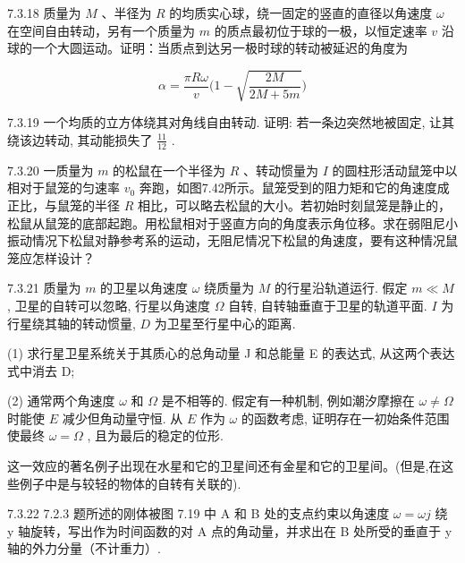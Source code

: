 \begin{problem}{7.3.18}
质量为 $M$ 、半径为 $R$ 的均质实心球，绕一固定的竖直的直径以角速度 $\omega$ 在空间自由转动，另有一个质量为 $m$ 的质点最初位于球的一极，以恒定速率 $v$ 沿球的一个大圆运动。证明：当质点到达另一极时球的转动被延迟的角度为

\[
\alpha = \frac {\pi R \omega}{v} \bigg (1 - \sqrt {\frac {2 M}{2 M + 5 m}} \bigg)
\]
\end{problem}
\clearpage


\begin{problem}{7.3.19}
一个均质的立方体绕其对角线自由转动. 证明: 若一条边突然地被固定, 让其绕该边转动, 其动能损失了 $\frac{11}{12}$ .
\end{problem}
\clearpage


\begin{problem}{7.3.20}
一质量为 $m$ 的松鼠在一个半径为 $R$ 、转动惯量为 $I$ 的圆柱形活动鼠笼中以相对于鼠笼的匀速率 $v_0$ 奔跑，如图7.42所示。鼠笼受到的阻力矩和它的角速度成正比，与鼠笼的半径 $R$ 相比，可以略去松鼠的大小。若初始时刻鼠笼是静止的，松鼠从鼠笼的底部起跑。用松鼠相对于竖直方向的角度表示角位移。求在弱阻尼小振动情况下松鼠对静参考系的运动，无阻尼情况下松鼠的角速度，要有这种情况鼠笼应怎样设计？
\begin{center}

\end{center}
\end{problem}
\clearpage


\begin{problem}{7.3.21}
质量为 $m$ 的卫星以角速度 $\omega$ 绕质量为 $M$ 的行星沿轨道运行. 假定 $m \ll M$ , 卫星的自转可以忽略, 行星以角速度 $\Omega$ 自转, 自转轴垂直于卫星的轨道平面. $I$ 为行星绕其轴的转动惯量, $D$ 为卫星至行星中心的距离.

(1) 求行星卫星系统关于其质心的总角动量 J 和总能量 E 的表达式, 从这两个表达式中消去 D;

(2) 通常两个角速度 $\omega$ 和 $\Omega$ 是不相等的. 假定有一种机制, 例如潮汐摩擦在 $\omega \neq \Omega$ 时能使 $E$ 减少但角动量守恒. 从 $E$ 作为 $\omega$ 的函数考虑, 证明存在一初始条件范围使最终 $\omega = \Omega$ , 且为最后的稳定的位形.

这一效应的著名例子出现在水星和它的卫星间还有金星和它的卫星间。(但是,在这些例子中是与较轻的物体的自转有关联的).
\end{problem}
\clearpage


\begin{problem}{7.3.22}
7.2.3 题所述的刚体被图 7.19 中 A 和 B 处的支点约束以角速度 $\omega = \omega j$ 绕 y 轴旋转，写出作为时间函数的对 A 点的角动量，并求出在 B 处所受的垂直于 y 轴的外力分量（不计重力）.
\begin{center}

\end{center}
\end{problem}
\clearpage


